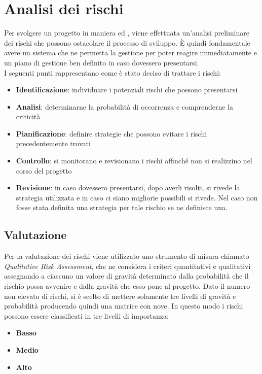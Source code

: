 
\newpage
\section{Analisi dei rischi} \label{AnalisiDeiRischi}
	Per svolgere un progetto in maniera  ed , viene effettuata un'analisi preliminare dei rischi che possono ostacolare il processo di sviluppo.
	È quindi fondamentale avere un sistema che ne permetta la gestione per poter reagire immediatamente e un piano di gestione ben definito in caso dovessero presentarsi.\\
	I seguenti punti rappresentano come è stato deciso di trattare i rischi:
	\begin{itemize}
		\item \textbf{Identificazione}: individuare i potenziali rischi che possono presentarsi
		\item \textbf{Analisi}: determinarne la probabilità di occorrenza e comprenderne la criticità
		\item \textbf{Pianificazione}: definire strategie che possono evitare i rischi precedentemente trovati
		\item \textbf{Controllo}: si monitorano e revisionano i rischi affinché non si realizzino nel corso del progetto
		\item \textbf{Revisione}: in caso dovessero presentarsi, dopo averli risolti, si rivede la strategia utilizzata e in caso ci siano migliorie possibili si rivede. Nel caso non fosse stata definita una strategia per tale rischio se ne definisce una.
	\end{itemize}
	\subsection{Valutazione}
	Per la valutazione dei rischi viene utilizzato uno strumento di misura chiamato \textit{Qualitative Risk Assessment}, che ne considera i criteri quantitativi e qualitativi assegnando a ciascuno un valore di gravità determinato dalla probabilità che il rischio possa avvenire e dalla gravità che esso pone al progetto.
	Dato il numero non elevato di rischi, si è scelto di mettere solamente tre livelli di gravità e probabilità producendo quindi una matrice con nove. In questo modo i rischi possono essere classificati in tre livelli di importanza:

	\begin{itemize}
		\item \textbf{Basso}
		\item \textbf{Medio}
		\item \textbf{Alto}
	\end{itemize}


